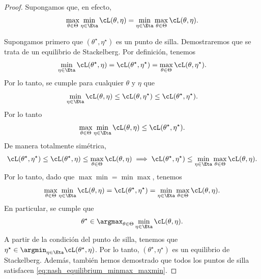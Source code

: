 \documentclass[../../book-main_es.tex]{subfiles}
\begin{document}
\begin{proof} %
    Supongamos que, en efecto,
    \begin{equation}
        \max_{\theta \in \Theta}\min_{\eta \in \Eta}\cL(\theta, \eta)
        = \min_{\eta \in \Eta}\max_{\theta  \in \Theta}\cL(\theta, \eta).
    \end{equation}

    Supongamos primero que \((\theta^{\star}, \eta^{\star})\) es un punto de silla.
    Demostraremos que se trata de un equilibrio de Stackelberg. Por definición, tenemos
    \begin{equation}
        \min_{\eta \in \Eta}\cL(\theta^{\star}, \eta) =
        \cL(\theta^{\star}, \eta^{\star}) = \max_{\theta \in
        \Theta}\cL(\theta, \eta^{\star}).
    \end{equation}
    Por lo tanto, se cumple para cualquier \(\theta\) y \(\eta\) que
    \begin{equation}
        \min_{\eta \in \Eta}\cL(\theta, \eta) \leq \cL(\theta,
        \eta^{\star}) \leq \cL(\theta^{\star}, \eta^{\star}).
    \end{equation}
    Por lo tanto
    \begin{equation}
        \max_{\theta \in \Theta}\min_{\eta \in \Eta}\cL(\theta, \eta) \leq
        \cL(\theta^{\star}, \eta^{\star}).
    \end{equation}
    De manera totalmente simétrica,
    \begin{equation}
        \cL(\theta^{\star}, \eta^{\star}) \leq \cL(\theta^{\star},
        \eta) \leq \max_{\theta \in \Theta}\cL(\theta, \eta)
        \implies \cL(\theta^{\star}, \eta^{\star}) \leq \min_{\eta
        \in \Eta}\max_{\theta \in \Theta}\cL(\theta, \eta).
    \end{equation}
    Por lo tanto, dado que \(\max\min = \min\max\), tenemos
    \begin{equation}\label{eq:nash_equilibrium_minmax_maxmin}
        \max_{\theta \in \Theta}\min_{\eta \in \Eta}\cL(\theta, \eta)
        = \cL(\theta^{\star}, \eta^{\star}) = \min_{\eta \in
        \Eta}\max_{\theta \in \Theta}\cL(\theta, \eta).
    \end{equation}
    En particular, se cumple que
    \begin{equation}
        \theta^{\star} \in \argmax_{\theta \in \Theta}\min_{\eta \in
        \Eta}\cL(\theta, \eta).
    \end{equation}
    A partir de la condición del punto de silla, tenemos que \(\eta^{\star} \in
    \argmin_{\eta \in \Eta}\cL(\theta^{\star}, \eta)\). Por lo tanto,
    \((\theta^{\star}, \eta^{\star})\) es un equilibrio de Stackelberg.
    Además, también hemos demostrado que todos los puntos de silla satisfacen
    \eqref{eq:nash_equilibrium_minmax_maxmin}.


\end{proof}
\end{document}
